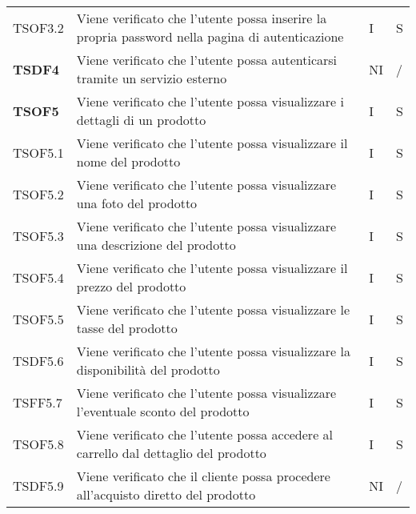 \begin{center}
\begin{longtable}[!h]{p{60px} p{240px} p{35px} p{35px}}
        TSOF3.2         & Viene verificato che l'utente possa inserire la propria password nella pagina di autenticazione                      & I              & S              \\
        \textbf{TSDF4}  & Viene verificato che l'utente possa autenticarsi tramite un servizio esterno                                         & NI             & /              \\
        \textbf{TSOF5}  & Viene verificato che l'utente possa visualizzare i dettagli di un prodotto                                           & I              & S              \\
        TSOF5.1         & Viene verificato che l'utente possa visualizzare il nome del prodotto                                                & I              & S              \\
        TSOF5.2         & Viene verificato che l'utente possa visualizzare una foto del prodotto                                               & I              & S              \\
        TSOF5.3         & Viene verificato che l'utente possa visualizzare una descrizione del prodotto                                        & I              & S              \\
        TSOF5.4         & Viene verificato che l'utente possa visualizzare il prezzo del prodotto                                              & I              & S              \\
        TSOF5.5         & Viene verificato che l'utente possa visualizzare le tasse del prodotto                                               & I              & S              \\
        TSDF5.6         & Viene verificato che l'utente possa visualizzare la disponibilità del prodotto                                       & I              & S              \\
        TSFF5.7         & Viene verificato che l'utente possa visualizzare l'eventuale sconto del prodotto                                     & I              & S              \\
        TSOF5.8         & Viene verificato che l'utente possa accedere al carrello dal dettaglio del prodotto                                  & I              & S              \\
        TSDF5.9         & Viene verificato che il cliente possa procedere all'acquisto diretto del prodotto                                    & NI             & /              \\

\end{longtable}
\end{center}
